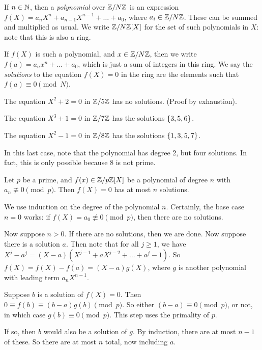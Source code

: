 \documentclass{article}
\begin{document}
If $n \in \mathbb{N}$, then a \textit{polynomial} over $\mathbb{Z}/N\mathbb{Z}$ is an expression $f(X) = a_n X^n + a_{n-1} X^{n-1} + \dots + a_0$, where $a_i \in \mathbb{Z}/N\mathbb{Z}$.
These can be summed and multiplied as usual.
We write $\mathbb{Z}/N\mathbb{Z}[X]$ for the set of such polynomials in $X$: note that this is also a ring.

If $f(X)$ is such a polynomial, and $x \in \mathbb{Z}/N\mathbb{Z}$, then we write $f(a) = a_n x^n + \dots + a_0$, which is just a sum of integers in this ring.
We say the \textit{solutions} to the equation $f(X) = 0$ in the ring are the elements such that $f(a) \equiv 0 \pmod{N}$.

\begin{example}
	The equation $X^2 + 2 = 0$ in $\mathbb{Z}/5\mathbb{Z}$ has no solutions. (Proof by exhaustion).
	
	The equation $X^3 + 1 = 0$ in $\mathbb{Z}/7\mathbb{Z}$ has the solutions $\left\lbrace 3, 5, 6 \right\rbrace$.
	
	The equation $X^2 - 1 = 0$ in $\mathbb{Z}/8\mathbb{Z}$ has the solutions $\left\lbrace 1, 3, 5, 7 \right\rbrace$.
	
	In this last case, note that the polynomial has degree 2, but four solutions. In fact, this is only possible because 8 is not prime.
\end{example}

\begin{theorem}
	\label{lagrange}
	Let $p$ be a prime, and $f(x) \in \mathbb{Z}/p\mathbb{Z}[X]$ be a polynomial of degree $n$ with $a_n \not\equiv 0 \pmod{p}$. Then $f(X) = 0$ has at most $n$ solutions.
\end{theorem}

\begin{prf}
	We use induction on the degree of the polynomial $n$.
	Certainly, the base case $n=0$ works: if $f(X) = a_0 \not\equiv 0 \pmod{p}$, then there are no solutions.
	
	Now suppose $n > 0$.	 If there are no solutions, then we are done.
	Now suppose there is a solution $a$.
	Then note that for all $j \geq 1$, we have $X^j - a^j = (X-a)(X^{j-1} + aX^{j-2} + \dots + a^j-1)$.
	So $f(X) = f(X) - f(a) = (X - a)g(X)$, where $g$ is another polynomial with leading term $a_n X^{n-1}$.
	
	Suppose $b$ is a solution of $f(X) = 0$.
	Then $0 \equiv f(b) \equiv (b-a) g(b) \pmod{p}$.
	So either $(b-a) \equiv 0 \pmod{p}$, or not, in which case $g(b) \equiv 0 \pmod{p}$. This step uses the primality of $p$.
	
	If so, then $b$ would also be a solution of $g$.
	By induction, there are at most $n-1$ of these. So there are at most $n$ total, now including $a$.
\end{prf}
\end{document}
